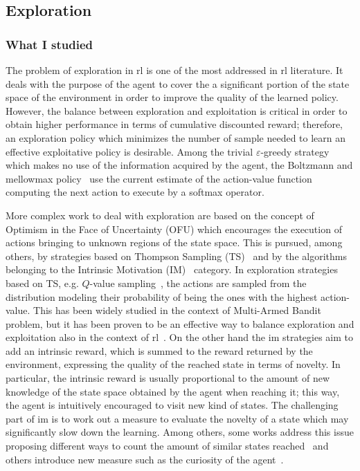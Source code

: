 \subsection{Exploration}
\subsubsection{What I studied}
The problem of exploration in \gls{rl} is one of the most addressed in \gls{rl} literature. It deals with the purpose of the agent to cover the a significant portion of the state space of the environment in order to improve the quality of the learned policy. However, the balance between exploration and exploitation is critical in order to obtain higher performance in terms of cumulative discounted reward; therefore, an exploration policy which minimizes the number of sample needed to learn an effective exploitative policy is desirable. Among the trivial $\varepsilon$-greedy strategy which makes no use of the information acquired by the agent, the Boltzmann and mellowmax policy~\cite{asadi2016alternative} use the current estimate of the action-value function computing the next action to execute by a softmax operator.

More complex work to deal with exploration are based on the concept of Optimism in the Face of Uncertainty (OFU) which encourages the execution of actions bringing to unknown regions of the state space. This is pursued, among others, by strategies based on Thompson Sampling (TS)~\cite{thompson1933likelihood} and by the algorithms belonging to the Intrinsic Motivation (IM)~\cite{schmidhuber1991possibility} category. In exploration strategies based on TS, e.g. $Q$-value sampling~\cite{dearden1998bayesian}, the actions are sampled from the distribution modeling their probability of being the ones with the highest action-value. This has been widely studied in the context of Multi-Armed Bandit problem, but it has been proven to be an effective way to balance exploration and exploitation also in the context of \gls{rl}~\cite{auer2007logarithmic}. On the other hand the \gls{im} strategies aim to add an intrinsic reward, which is summed to the reward returned by the environment, expressing the quality of the reached state in terms of novelty. In particular, the intrinsic reward is usually proportional to the amount of new knowledge of the state space obtained by the agent when reaching it; this way, the agent is intuitively encouraged to visit new kind of states. The challenging part of \gls{im} is to work out a measure to evaluate the novelty of a state which may significantly slow down the learning. Among others, some works address this issue proposing different ways to count the amount of similar states reached~\cite{tang2017exploration} and others introduce new measure such as the curiosity of the agent~\cite{schmidhuber1991possibility, pathak2017curiosity}.

